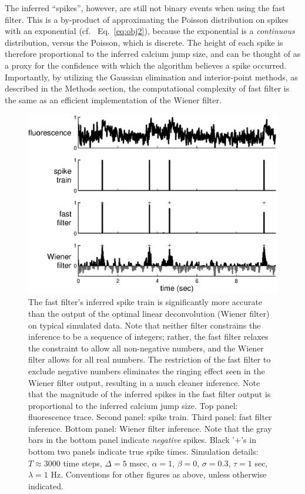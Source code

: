 \documentclass{article}
\newcommand{\Del}{\Delta}
\newcommand{\sig}{\sigma}
\newcommand{\lam}{\lambda}
\newcommand{\foopsi}{fast }
\begin{document}
The inferred ``spikes'', however, are still not binary events when using the \foopsi filter.  This is a by-product of approximating the Poisson distribution on spikes with an exponential (cf.~ Eq.~\eqref{eq:obj2}), because the exponential is a \emph{continuous} distribution, versus the Poisson, which is discrete.  The height of each spike is therefore proportional to the inferred calcium jump size, and can be thought of as a proxy for the confidence with which the algorithm believes a spike occurred.   Importantly, by utilizing the Gaussian elimination and interior-point methods, as described in the Methods section, the computational complexity of \foopsi filter is the same as an efficient implementation of the Wiener filter.  




\begin{figure}[h!]
\centering \includegraphics[width=.9\linewidth]{woopsi_inf_b13}
\caption[\foopsi filter outperforms Wiener filter]{The \foopsi filter's inferred spike train is significantly more accurate than the output of the optimal linear deconvolution (Wiener filter) on typical simulated data. Note that neither filter constrains the inference to be a sequence of integers; rather, the \foopsi filter relaxes the constraint to allow all non-negative numbers, and the Wiener filter allows for all real numbers.  The restriction of the \foopsi filter to exclude negative numbers eliminates the ringing effect seen in the Wiener filter output, resulting in a much cleaner inference.  Note that the magnitude of the inferred spikes in the \foopsi filter output is proportional to the inferred calcium jump size.  Top panel: fluorescence trace.  Second panel: spike train.  Third panel: \foopsi filter inference.  Bottom panel: Wiener filter inference.  Note that the gray bars in the bottom panel indicate \emph{negative} spikes. Black '$+$'s in bottom two panels indicate true spike times.  Simulation details: $T\approx 3000$ time steps, $\Del=5$ msec, $\alpha=1$, $\beta=0$, $\sig=0.3$, $\tau=1$ sec, $\lam=1$ Hz. Conventions for other figures as above, unless otherwise indicated.} \label{fig:woopsi_inf}
\end{figure}
\end{document}
